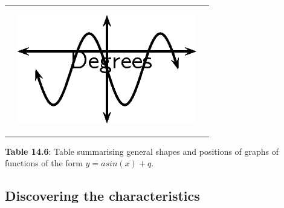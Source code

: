 \begin{center}
\begin{xtabular*}{\mytablewidth}[t]{|p{10\mystarwidth}|p{10\mystarwidth}|p{10\mystarwidth}|}
\begin{center}
\vspace{.1in}
\end{center}    
    &
\setcounter{subfigure}{0}
\label{m39414*id85433}
\begin{center}
\label{m39414*id85433!!!underscore!!!media}\label{m39414*id85433!!!underscore!!!printimage}\includegraphics{col11306.imgs/m39414_MG10C15_022.png} %
\vspace{2pt}
\vspace{.1in}
\end{center}    
\tabularnewline{}
\end{xtabular*}
\end{center}
\begin{center}{\small\bfseries Table 14.6}: Table summarising general shapes and positions of graphs of functions of the form $y=asin(x)+q$.\end{center}
\par

\subsection*{Discovering the characteristics}

